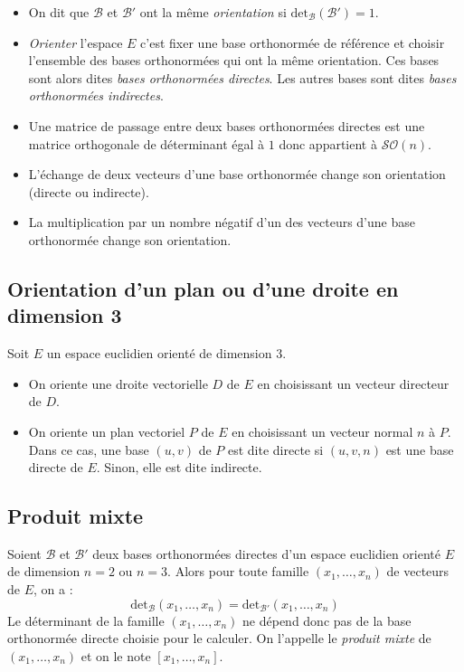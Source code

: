 \documentclass[french,11pt,twoside]{VcCours}
\begin{document}
\begin{Definition}{}
\begin{itemize}
\item On dit que $\mathcal{B}$ et $\mathcal{B}'$ ont la même \emph{orientation} si $\textrm{det}_{\mathcal{B}}(\mathcal{B}')=1$.
\item \emph{Orienter} l'espace $E$ c'est fixer une base orthonormée de référence et choisir l'ensemble des bases orthonormées qui ont la même orientation. Ces bases sont alors dites \emph{bases orthonormées directes}. Les autres bases sont dites \emph{bases orthonormées indirectes}.
\end{itemize}
\end{Definition}

\begin{Remarques}{}
\begin{itemize}
\item Une matrice de passage entre deux bases orthonormées directes est une matrice orthogonale de déterminant égal à $1$ donc appartient à $\mathcal{SO}(n)$.
\item L'échange de deux vecteurs d'une base orthonormée change son orientation (directe ou indirecte).
\item La multiplication par un nombre négatif d'un des vecteurs d'une base orthonormée change son orientation.
\end{itemize}
\end{Remarques}

\subsection{Orientation d'un plan ou d'une droite en dimension 3}
Soit $E$ un espace euclidien orienté de dimension $3$.
\begin{itemize}
\item On oriente une droite vectorielle $D$ de $E$ en choisissant un vecteur directeur de $D$.
\item On oriente un plan vectoriel $P$ de $E$ en choisissant un vecteur normal $n$ à $P$. Dans ce cas, une base $(u,v)$ de $P$ est dite directe si $(u,v,n)$ est une base directe de $E$. Sinon, elle est dite indirecte.
\end{itemize}

\subsection{Produit mixte}

\begin{TheoremeDefinition}{} Soient $\mathcal{B}$ et $\mathcal{B}'$ deux bases orthonormées directes d'un espace euclidien orienté $E$ de dimension $n=2$ ou $n=3$. Alors pour toute famille $(x_1, \ldots, x_n)$ de vecteurs de $E$, on a :
$$ \textrm{det}_{\mathcal{B}}(x_1, \ldots, x_n) =  \textrm{det}_{\mathcal{B}'}(x_1, \ldots, x_n) $$
Le déterminant de la famille $(x_1, \ldots, x_n)$ ne dépend donc pas de la base orthonormée directe choisie pour le calculer. On l'appelle le \emph{produit mixte} de $(x_1, \ldots, x_n)$ et on le note $[x_1, \ldots, x_n]$.
\end{TheoremeDefinition}{}
\end{document}
